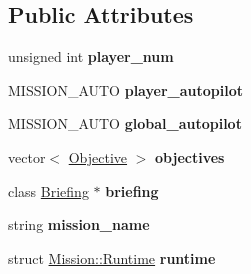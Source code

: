 \subsection*{Public Attributes}
\begin{DoxyCompactItemize}
\item 
unsigned int {\bfseries player\+\_\+num}\hypertarget{classMission_a824c1a747136fd3384cc4ff59172c1ab}{}\label{classMission_a824c1a747136fd3384cc4ff59172c1ab}

\item 
M\+I\+S\+S\+I\+O\+N\+\_\+\+A\+U\+TO {\bfseries player\+\_\+autopilot}\hypertarget{classMission_a8dd33ddd0be2f7fdc942b9bedde6cc53}{}\label{classMission_a8dd33ddd0be2f7fdc942b9bedde6cc53}

\item 
M\+I\+S\+S\+I\+O\+N\+\_\+\+A\+U\+TO {\bfseries global\+\_\+autopilot}\hypertarget{classMission_a0f7e0dc5c727231fad8e2ac67959ebf0}{}\label{classMission_a0f7e0dc5c727231fad8e2ac67959ebf0}

\item 
vector$<$ \hyperlink{structMission_1_1Objective}{Objective} $>$ {\bfseries objectives}\hypertarget{classMission_ae32f512fa2c63c61e3d35a814196d678}{}\label{classMission_ae32f512fa2c63c61e3d35a814196d678}

\item 
class \hyperlink{classBriefing}{Briefing} $\ast$ {\bfseries briefing}\hypertarget{classMission_a9ff36a58e6a5342af6c519ea1a528cb1}{}\label{classMission_a9ff36a58e6a5342af6c519ea1a528cb1}

\item 
string {\bfseries mission\+\_\+name}\hypertarget{classMission_a12949feaa68210796c3a7ef94185a152}{}\label{classMission_a12949feaa68210796c3a7ef94185a152}

\item 
struct \hyperlink{structMission_1_1Runtime}{Mission\+::\+Runtime} {\bfseries runtime}\hypertarget{classMission_ad406a525f72e55c1dc05400c80370d16}{}\label{classMission_ad406a525f72e55c1dc05400c80370d16}

\end{DoxyCompactItemize}
